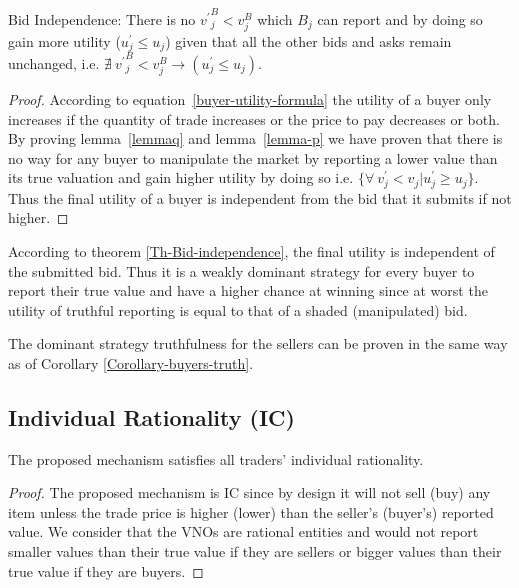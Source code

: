 \begin{Theorem}{Bid Independence:} There is no ${v^\prime}^B_{j} < v^B_{j}$ which $B_{j}$ can report and by doing so gain more utility (${u_{j}^\prime} \leq u_{j}$) given that all the other bids and asks remain unchanged, i.e. $\nexists \ {{v^\prime}^B_{j} < v^B_{j}}\rightarrow ({u_{j}^\prime} \leq u_{j})$.
\label{Th-Bid-independence}
\end{Theorem}
\begin{proof}
According to equation~\ref{buyer-utility-formula} the utility of a buyer only increases if the quantity of trade increases or the price to pay decreases or both. By proving lemma~\ref{lemmaq} and lemma~\ref{lemma-p} we have proven that there is no way for any buyer to manipulate the market by reporting a lower value than its true valuation and gain higher utility by doing so i.e. $\{\forall \ v^\prime_j < v_j | u^\prime_{j} \geq u_{j} \}$. Thus the final utility of a buyer is independent from the bid that it submits if not higher.
\end{proof}

\begin{Corollary}
According to theorem \ref{Th-Bid-independence}, the final utility is independent of the submitted bid. Thus it is a weakly dominant strategy for every buyer to report their true value and have a higher chance at winning since at worst the utility of truthful reporting is equal to that of a shaded (manipulated) bid.
\label{Corollary-buyers-truth}
\end{Corollary}
\begin{Corollary}
The dominant strategy truthfulness for the sellers can be proven in the same way as of Corollary \ref{Corollary-buyers-truth}.
\label{Corollary-sellers-truth}
\end{Corollary}

\subsection{Individual Rationality (IC)}
\begin{Theorem}
The proposed mechanism satisfies all traders' individual rationality.
\end{Theorem}
\begin{proof}
The proposed mechanism is IC since by design it will not sell (buy) any item unless the trade price is higher (lower) than the seller's (buyer's) reported value. We consider that the \acp{VNO} are rational entities and would not report smaller values than their true value if they are sellers or bigger values than their true value if they are buyers.
\end{proof}


